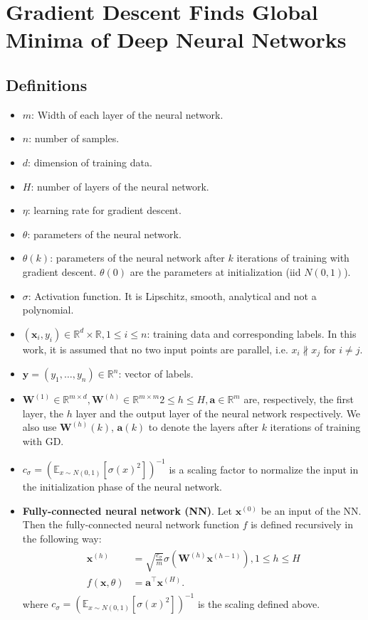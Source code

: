 \documentclass[11pt]{article}
\title{}
\date{}
\author{}
\theoremstyle{plain}
\theoremstyle{definition}
\newcommand{\R}{\mathbb{R}}
\begin{document}
\section{Gradient Descent Finds Global Minima of Deep Neural Networks}
\subsection*{Definitions}
\begin{itemize}
\item $m$: Width of each layer of the neural network.
\item $n$: number of samples.
\item $d$: dimension of training data.
\item $H$: number of layers of the neural network.
\item $\eta$: learning rate for gradient descent.
\item $\theta$: parameters of the neural network. 
\item $\theta(k)$: parameters of the neural network after $k$ iterations of training with gradient descent. $\theta(0)$ are the parameters at initialization (iid $N(0,1)$).
\item $\sigma$: Activation function. It is Lipschitz, smooth, analytical and not a polynomial.
\item $(\mathbf{x}_i, y_i) \in \R^d\times\R, 1\leq i\leq n$: training data and corresponding labels. In this work, it is assumed that no two input points are parallel, i.e. $x_i \nparallel x_j$ for $i\neq j$.
\item $\mathbf{y} = (y_1,\dots, y_n) \in \R^n$: vector of labels.
\item $\mathbf{W}^{(1)} \in \R^{m\times d}, \mathbf{W}^{(h)}\in \R^{m\times m} 2\leq h\leq H, \mathbf{a}\in \R^m$ are, respectively, the first layer, the $h$ layer and the output layer of the neural network respectively. We also use $\mathbf{W}^{(h)}(k)$, $\mathbf{a}(k)$ to denote the layers after $k$ iterations of training with GD.
\item $c_{\sigma}=\left(\mathbb{E}_{x \sim N(0,1)}\left[\sigma(x)^{2}\right]\right)^{-1}$ is a scaling factor to normalize the input in the initialization phase of the neural network.
\item \textbf{Fully-connected neural network (NN)}. Let $\mathbf{x}^{(0)}$ be an input of the NN. Then the fully-connected neural network function $f$ is defined recursively in the following way:
\begin{align*} 
\begin{aligned}
     \mathbf{x}^{(h)} &= \sqrt{\frac{c_\sigma}{m}} \sigma\left(\mathbf{W}^{(h)} \mathbf{x}^{(h-1)}\right), 1 \leq h \leq H \\
     f(\mathbf{x}, \theta) &= \mathbf{a}^\top \mathbf{x}^{(H)}.
\end{aligned}
\end{align*}
where $c_{\sigma}=\left(\mathbb{E}_{x \sim N(0,1)}\left[\sigma(x)^{2}\right]\right)^{-1}$ is the scaling defined above.


\end{itemize}
\end{document}
